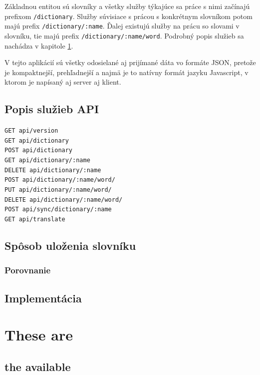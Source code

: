 \documentclass[
  digital, %
  table,   %
  lof,     %
  lot,     %
]{fithesis3}
\begin{document}
Základnou entitou sú slovníky a všetky služby týkajúce sa práce s nimi začínajú prefixom \texttt{/dictionary}. Služby súvisiace s prácou s konkrétnym slovníkom potom majú prefix \texttt{/dictionary/:name}. Ďalej existujú služby na prácu so slovami v slovníku, tie majú prefix \texttt{/dictionary/:name/word}. Podrobný popis služieb sa nachádza v kapitole \ref{sec:api}.

V tejto aplikácií sú všetky odosielané aj prijímané dáta vo formáte JSON, pretože je kompaktnejší, prehľadnejší a najmä je to natívny formát jazyku Javascript, v ktorom je napísaný aj server aj klient.


\section{Popis služieb API} \label{sec:api}

\texttt{GET api/version}
\\
\texttt{GET api/dictionary}
\\
\texttt{POST api/dictionary}
\\
\texttt{GET api/dictionary/:name}
\\
\texttt{DELETE api/dictionary/:name}
\\
\texttt{POST api/dictionary/:name/word/}
\\
\texttt{PUT api/dictionary/:name/word/}
\\
\texttt{DELETE api/dictionary/:name/word/}
\\
\texttt{POST api/sync/dictionary/:name}
\\
\texttt{GET api/translate}
\\


\section{Spôsob uloženia slovníku}
\subsection{Porovnanie}


\section{Implementácia}

\chapter{These are}
\section{the available}
\end{document}
